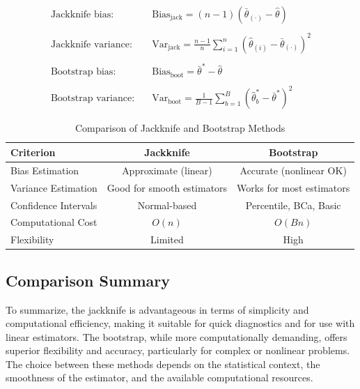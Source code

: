 \documentclass{article}
\begin{document}
\begin{tcolorbox}[title=Jackknife and Bootstrap Key Formulas]
\begin{align*}
\text{Jackknife bias:} \quad & \text{Bias}_{\text{jack}} = (n - 1)(\bar{\theta}_{(\cdot)} - \hat{\theta}) \\\\
\text{Jackknife variance:} \quad & \text{Var}_{\text{jack}} = \frac{n - 1}{n} \sum_{i=1}^n \left( \hat{\theta}_{(i)} - \bar{\theta}_{(\cdot)} \right)^2 \\\\
\text{Bootstrap bias:} \quad & \text{Bias}_{\text{boot}} = \bar{\theta}^* - \hat{\theta} \\\\
\text{Bootstrap variance:} \quad & \text{Var}_{\text{boot}} = \frac{1}{B - 1} \sum_{b=1}^B \left( \hat{\theta}_b^* - \bar{\theta}^* \right)^2
\end{align*}
\end{tcolorbox}


\begin{table}[h!]
\centering
\caption{Comparison of Jackknife and Bootstrap Methods}
\begin{tabular}{|l|c|c|}
\hline
\textbf{Criterion} & \textbf{Jackknife} & \textbf{Bootstrap} \\
\hline
Bias Estimation    & Approximate (linear) & Accurate (nonlinear OK) \\
\hline
Variance Estimation & Good for smooth estimators & Works for most estimators \\
\hline
Confidence Intervals & Normal-based & Percentile, BCa, Basic \\
\hline
Computational Cost & $O(n)$ & $O(Bn)$ \\
\hline
Flexibility        & Limited & High \\
\hline
\end{tabular}
\end{table}


\subsection{Comparison Summary}

To summarize, the jackknife is advantageous in terms of simplicity and computational efficiency, making it suitable for quick diagnostics and for use with linear estimators. The bootstrap, while more computationally demanding, offers superior flexibility and accuracy, particularly for complex or nonlinear problems. The choice between these methods depends on the statistical context, the smoothness of the estimator, and the available computational resources.\\
\end{document}
